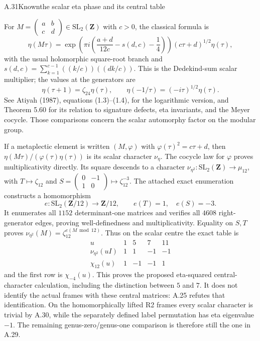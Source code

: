 \begin{statement}{A.31}{Known}{the scalar eta phase and its central table}
\citep{LitAtiyah1987}
\end{statement}
For $M=\left(\begin{smallmatrix}a&b\\c&d\end{smallmatrix}\right)
\in\mathrm{SL}_2(\mathbf Z)$ with $c>0$, the classical formula is
\[
 \eta(M\tau)=
 \exp\!\left(\pi i\left(\frac{a+d}{12c}-s(d,c)-\frac14\right)\right)
 (c\tau+d)^{1/2}\eta(\tau),
\]
with the usual holomorphic square-root branch and
$s(d,c)=\sum_{k=1}^{c-1}((k/c))((dk/c))$.
This is the Dedekind-sum scalar multiplier; the values at the
generators are
\[
 \eta(\tau+1)=\zeta_{24}\eta(\tau),\qquad
 \eta(-1/\tau)=(-i\tau)^{1/2}\eta(\tau).
\]
See Atiyah (1987), equations (1.3)--(1.4), for the logarithmic
version, and Theorem 5.60 for its relation to signature defects,
eta invariants, and the Meyer cocycle. Those comparisons concern
the scalar automorphy factor on the modular group.

If a metaplectic element is written $(M,\varphi)$ with
$\varphi(\tau)^2=c\tau+d$, then
$\eta(M\tau)/(\varphi(\tau)\eta(\tau))$ is its scalar
character $\nu_\eta$. The cocycle law for $\varphi$ proves
multiplicativity directly. Its square descends to a character
$\nu_{\eta^2}:\mathrm{SL}_2(\mathbf Z)\to\mu_{12}$,
with $T\mapsto\zeta_{12}$ and
$S=\left(\begin{smallmatrix}0&-1\\1&0\end{smallmatrix}\right)
\mapsto\zeta_{12}^{-3}$.
The attached exact enumeration constructs a homomorphism
\[
 e:\mathrm{SL}_2(\mathbf Z/12)\longrightarrow\mathbf Z/12,
 \qquad e(T)=1,\quad e(S)=-3.
\]
It enumerates all $1152$ determinant-one matrices and verifies all
$4608$ right-generator edges, proving well-definedness and
multiplicativity. Equality on $S,T$ proves
$\nu_{\eta^2}(M)=\zeta_{12}^{e(M\bmod12)}$. Thus on the scalar
centre the exact table is
\[
\begin{array}{c|rrrr}
 u&1&5&7&11\\\hline
 \nu_{\eta^2}(uI)&1&1&-1&-1\\
 \chi_{12}(u)&1&-1&-1&1
\end{array}
\]
and the first row is $\chi_{-4}(u)$. This proves the proposed
eta-squared central-character calculation, including the distinction
between $5$ and $7$. It does not identify the actual frames with
these central matrices: A.25 refutes that identification. On the
homomorphically lifted R2 frames every scalar character is trivial
by A.30, while the separately defined label permutation has eta
eigenvalue $-1$. The remaining genus-zero/genus-one comparison is
therefore still the one in A.29.

